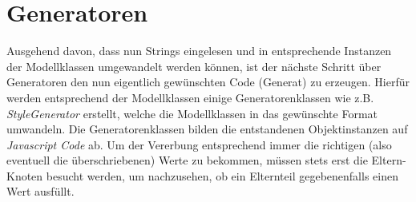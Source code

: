 \section{Generatoren}Ausgehend davon, dass nun Strings eingelesen und in entsprechende Instanzen der Modellklassen umgewandelt werden können, ist der nächste Schritt über Generatoren den nun eigentlich gewünschten Code (Generat) zu erzeugen. Hierfür werden entsprechend der Modellklassen einige Generatorenklassen wie z.B. \textit{StyleGenerator} erstellt, welche die Modellklassen in das gewünschte Format umwandeln. Die Generatorenklassen bilden die entstandenen Objektinstanzen auf \textit{Javascript Code} ab. Um der Vererbung entsprechend immer die richtigen (also eventuell die überschriebenen) Werte zu bekommen, müssen stets erst die Eltern-Knoten besucht werden, um nachzusehen, ob ein Elternteil gegebenenfalls einen Wert ausfüllt.